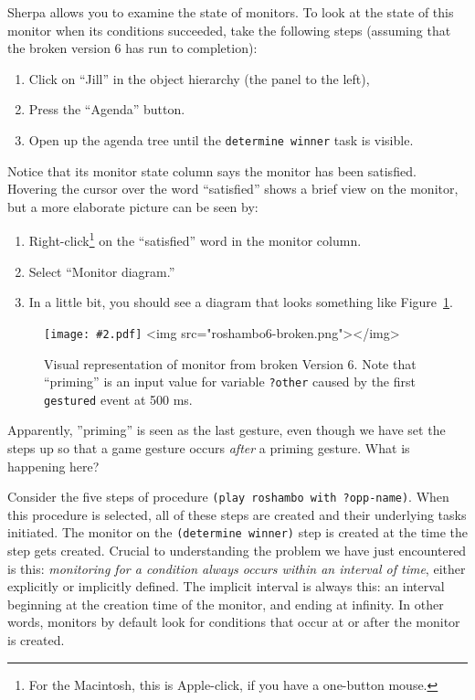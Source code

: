 \documentclass[12pt]{article}
\newcommand{\ic}{\texttt}
\newenvironment{float}%
   {\begin{center}}%
   {\end{center}
   }
\newcommand{\img}[2]
 {\texonly \texttt{[image: \#2.pdf]} \endtexonly
  \htmlonly \rawhtml <img src="#2.png"></img>\endrawhtml \endhtmlonly}
\begin{document}
Sherpa allows you to examine the state of monitors. To look at the state of this monitor when its conditions succeeded, take the following steps (assuming that the broken version 6 has run to completion):
\begin{enumerate}
\item Click on ``Jill'' in the object hierarchy (the panel to the left),
\item Press the ``Agenda'' button. 
\item Open up the agenda tree until the \ic{determine winner} task is visible.
\end{enumerate}

Notice that its monitor state column says the monitor has been satisfied. Hovering the cursor over the word ``satisfied'' shows a brief view on the monitor, but a more elaborate picture can be seen by:

\begin{enumerate}
\item Right-click\footnote{For the Macintosh, this is Apple-click, if you have a one-button mouse.} on the ``satisfied'' word in the monitor column.
\item Select ``Monitor diagram.''
\item In a little bit, you should see a diagram that looks something like Figure~\ref{fig.roshambo.6.broken.monitor}.
\end{enumerate}

\begin{figure}
\begin{float}
\centerline {
\img{4in}{roshambo6-broken}
}
\end{float}
\caption{Visual representation of monitor from broken Version 6. Note that ``priming'' is an input value for variable \ic{?other} caused by the first \ic{gestured} event at 500 ms.\label{fig.roshambo.6.broken.monitor}}
\end{figure}

Apparently, ''priming'' is seen as the last gesture, even though we have set the steps up so that a game gesture occurs \textit{after} a priming gesture. What is happening here? 

Consider the five steps of procedure \ic{(play roshambo with ?opp-name)}. When this procedure is selected, all of these steps are created and their underlying tasks initiated. The monitor on the \ic{(determine winner)} step is created at the time the step gets created. Crucial to understanding the problem we have just encountered is this: \textit{monitoring for a condition always occurs within an interval of time}, either explicitly or implicitly defined. The implicit interval is always this: an interval beginning at the creation time of the monitor, and ending at infinity. In other words, monitors by default look for conditions that occur at or after the monitor is created.
\end{document}
